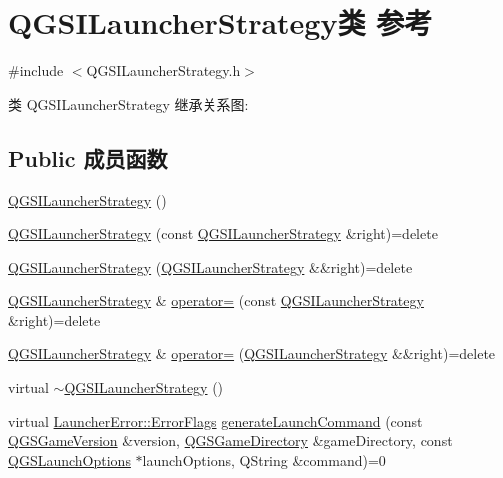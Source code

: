 \hypertarget{class_q_g_s_i_launcher_strategy}{}\section{Q\+G\+S\+I\+Launcher\+Strategy类 参考}
\label{class_q_g_s_i_launcher_strategy}


{\ttfamily \#include $<$Q\+G\+S\+I\+Launcher\+Strategy.\+h$>$}



类 Q\+G\+S\+I\+Launcher\+Strategy 继承关系图\+:
\subsection*{Public 成员函数}
\begin{DoxyCompactItemize}
\item 
\mbox{\hyperlink{class_q_g_s_i_launcher_strategy_aa45a8d5ff2c02ebefe418beb8183ad3e}{Q\+G\+S\+I\+Launcher\+Strategy}} ()
\item 
\mbox{\hyperlink{class_q_g_s_i_launcher_strategy_a864252fe899cfe21b97218a89ca188b3}{Q\+G\+S\+I\+Launcher\+Strategy}} (const \mbox{\hyperlink{class_q_g_s_i_launcher_strategy}{Q\+G\+S\+I\+Launcher\+Strategy}} \&right)=delete
\item 
\mbox{\hyperlink{class_q_g_s_i_launcher_strategy_ae2c84f9cfb656bf821870161bd0becec}{Q\+G\+S\+I\+Launcher\+Strategy}} (\mbox{\hyperlink{class_q_g_s_i_launcher_strategy}{Q\+G\+S\+I\+Launcher\+Strategy}} \&\&right)=delete
\item 
\mbox{\hyperlink{class_q_g_s_i_launcher_strategy}{Q\+G\+S\+I\+Launcher\+Strategy}} \& \mbox{\hyperlink{class_q_g_s_i_launcher_strategy_ae47233d64af17d2435f5c61640db8779}{operator=}} (const \mbox{\hyperlink{class_q_g_s_i_launcher_strategy}{Q\+G\+S\+I\+Launcher\+Strategy}} \&right)=delete
\item 
\mbox{\hyperlink{class_q_g_s_i_launcher_strategy}{Q\+G\+S\+I\+Launcher\+Strategy}} \& \mbox{\hyperlink{class_q_g_s_i_launcher_strategy_a200e750013974d9abfc34c6910f6a35f}{operator=}} (\mbox{\hyperlink{class_q_g_s_i_launcher_strategy}{Q\+G\+S\+I\+Launcher\+Strategy}} \&\&right)=delete
\item 
virtual \mbox{\hyperlink{class_q_g_s_i_launcher_strategy_a02f896115554dd6da7f0d996633b8f16}{$\sim$\+Q\+G\+S\+I\+Launcher\+Strategy}} ()
\item 
virtual \mbox{\hyperlink{namespace_launcher_error_ac3a8c0329368b890069c60ac80628085}{Launcher\+Error\+::\+Error\+Flags}} \mbox{\hyperlink{class_q_g_s_i_launcher_strategy_ab09ca6f8e4bbe0a2d6bdb6848c18638b}{generate\+Launch\+Command}} (const \mbox{\hyperlink{class_q_g_s_game_version}{Q\+G\+S\+Game\+Version}} \&version, \mbox{\hyperlink{class_q_g_s_game_directory}{Q\+G\+S\+Game\+Directory}} \&game\+Directory, const \mbox{\hyperlink{class_q_g_s_launch_options}{Q\+G\+S\+Launch\+Options}} $\ast$launch\+Options, Q\+String \&command)=0
\end{DoxyCompactItemize}
